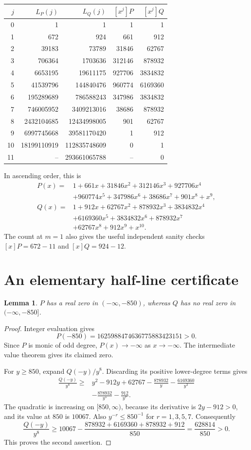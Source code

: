 \documentclass[11pt]{article}
\newtheorem{lemma}[theorem]{Lemma}
\begin{document}
\begin{center}
\begin{tabular}{r|r r|r r}
\toprule
$j$ & $L_P(j)$ & $L_Q(j)$ & $[x^j]P$ & $[x^j]Q$\\
\midrule
0&1&1&1&1\\
1&672&924&661&912\\
2&39183&73789&31846&62767\\
3&706364&1703636&312146&878932\\
4&6653195&19611175&927706&3834832\\
5&41539796&144840476&960774&6169360\\
6&195289689&786588243&347986&3834832\\
7&746005952&3409213016&38686&878932\\
8&2432104685&12434998005&901&62767\\
9&6997745668&39581170420&1&912\\
10&18199110919&112835748609&0&1\\
11&--&293661065788&--&0\\
\bottomrule
\end{tabular}
\end{center}
In ascending order, this is
\begin{align*}
P(x)={}&1+661x+31846x^2+312146x^3+927706x^4\\
&+960774x^5+347986x^6+38686x^7+901x^8+x^9,\\
Q(x)={}&1+912x+62767x^2+878932x^3+3834832x^4\\
&+6169360x^5+3834832x^6+878932x^7\\
&+62767x^8+912x^9+x^{10}.
\end{align*}
The count at $m=1$ also gives the useful independent sanity checks $[x]P=672-11$ and $[x]Q=924-12$.

\section{An elementary half-line certificate}
\begin{lemma}\label{lem:separation}
$P$ has a real zero in $(-\infty,-850)$, whereas $Q$ has no real zero in $(-\infty,-850]$.
\end{lemma}
\begin{proof}
Integer evaluation gives
\[
P(-850)=1625988474636775883423151>0.
\]
Since $P$ is monic of odd degree, $P(x)\to-\infty$ as $x\to-\infty$. The intermediate value theorem gives its claimed zero.

For $y\ge850$, expand $Q(-y)/y^8$. Discarding its positive lower-degree terms gives
\begin{align*}
\frac{Q(-y)}{y^8}\ge{}&y^2-912y+62767
 -\frac{878932}{y}-\frac{6169360}{y^3}\\
&-\frac{878932}{y^5}-\frac{912}{y^7}.
\end{align*}
The quadratic is increasing on $[850,\infty)$, because its derivative is $2y-912>0$, and its value at $850$ is $10067$. Also $y^{-r}\le850^{-1}$ for $r=1,3,5,7$. Consequently
\[
\frac{Q(-y)}{y^8}\ge10067-\frac{878932+6169360+878932+912}{850}
=\frac{628814}{850}>0.
\]
This proves the second assertion.
\end{proof}
\end{document}
